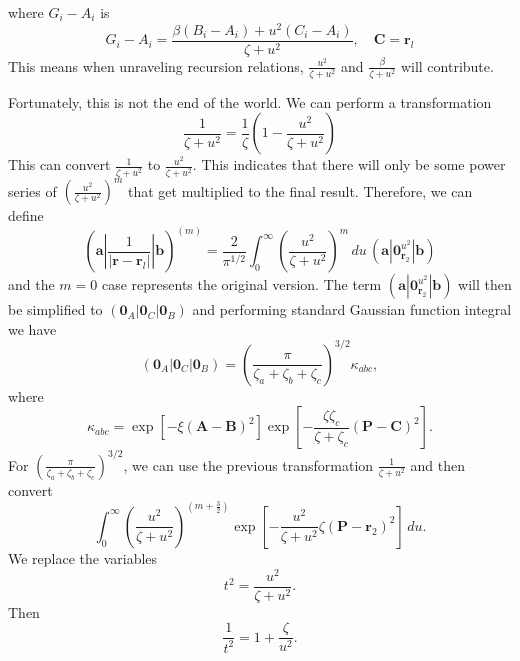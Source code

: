 \documentclass[12pt,a4paper,openany,twoside]{article}
\numberwithin{equation}{section}
\begin{document}
where $G_i-A_i$ is
\begin{equation}
    G_i - A_i = \frac{\beta (B_i-A_i) + u^2 (C_i - A_i)}{\zeta + u^2}, \quad \boldsymbol{C} = \boldsymbol{r}_l
\end{equation}
This means when unraveling recursion relations, $\frac{u^2}{\zeta+u^2}$ and $\frac{\beta}{\zeta+u^2}$ will contribute.

Fortunately, this is not the end of the world. We can perform a transformation
\begin{equation}
    \frac{1}{\zeta + u^2} = \frac{1}{\zeta} \left(1 - \frac{u^2}{\zeta + u^2}\right)
\end{equation}
This can convert $\frac{1}{\zeta+u^2}$ to $\frac{u^2}{\zeta+u^2}$. This indicates that there will only be some power series of $(\frac{u^2}{\zeta+u^2})^m$ that get multiplied to the final result. Therefore, we can define
\begin{equation}
    (\boldsymbol{a} | \frac{1}{|\boldsymbol{r} - \boldsymbol{r}_l|} |\boldsymbol{b} )^{(m)} = \frac{2}{\pi^{1 / 2}} \int_0^\infty \left(\frac{u^2}{\zeta+u^2}\right)^m\, du \, (\boldsymbol{a}|\boldsymbol{0}_{\boldsymbol{r}_2}^{u^2}|\boldsymbol{b})
\end{equation}
and the $m=0$ case represents the original version. The term $(\boldsymbol{a}|\boldsymbol{0}_{\boldsymbol{r}_2}^{u^2}|\boldsymbol{b})$ will then be simplified to $(\boldsymbol{0}_A|\boldsymbol{0}_C|\boldsymbol{0}_B)$ and performing standard Gaussian function integral we have
\begin{equation}
    \left(\boldsymbol{0}_{A}\left|\boldsymbol{0}_{C}\right| \boldsymbol{0}_{B}\right)=\left(\frac{\pi}{\zeta_{a}+\zeta_{b}+\zeta_{c}}\right)^{3 / 2} \kappa_{a b c},
\end{equation}
where
\begin{equation}
    \kappa_{a b c}=\exp \left[-\xi(\boldsymbol{A}-\boldsymbol{B})^{2}\right] \exp \left[-\frac{\zeta \zeta_{c}}{\zeta+\zeta_{c}}(\boldsymbol{P}-\boldsymbol{C})^{2}\right].
\end{equation}
For $\left(\frac{\pi}{\zeta_{a}+\zeta_{b}+\zeta_{c}}\right)^{3 / 2}$, we can use the previous transformation $\frac{1}{\zeta + u^2}$ and then convert
\[
    \int_0^\infty \left(\frac{u^2}{\zeta + u^2}\right)^{(m+\frac{3}{2})}\exp\left[-\frac{u^2}{\zeta + u^2} \zeta (\boldsymbol{P}-\boldsymbol{r}_2)^2\right]\, du.
\]
We replace the variables
\begin{equation}
    t^2 = \frac{u^2}{\zeta + u^2}.
\end{equation}
Then
\begin{equation}
    \frac{1}{t^2} = 1 + \frac{\zeta}{u^2}.
\end{equation}
\end{document}
